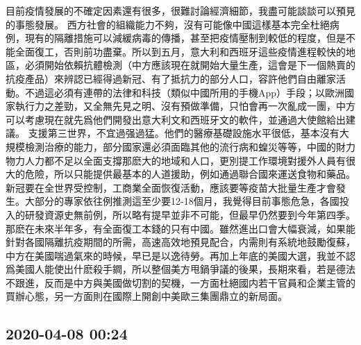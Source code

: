\documentclass[twocolumn]{ctexart}
\begin{document}
目前疫情發展的不確定因素還有很多，很難討論經濟細節，我盡可能談談可以預見的事態發展。
西方社會的組織能力不夠，沒有可能像中國這樣基本完全杜絕病例，現有的隔離措施可以減緩病毒的傳播，甚至把疫情壓制到較低的程度，但是不能全面復工，否則前功盡棄。所以到五月，意大利和西班牙這些疫情進程較快的地區，必須開始依賴抗體檢測（中方應該現在就開始大量生產，這會是下一個熱賣的抗疫產品）來辨認已經得過新冠、有了抵抗力的部分人口，容許他們自由離家活動。不過這必須有連帶的法律和科技（類似中國所用的手機App）手段；以歐洲國家執行力之差勁，又全無先見之明、沒有預做準備，只怕會再一次亂成一團，中方可以考慮現在就先爲他們開發出意大利文和西班牙文的軟件，並通過大使館給出建議。
支援第三世界，不宜過强過猛。他們的醫療基礎設施水平很低，基本沒有大規模檢測治療的能力，部分國家還必須面臨其他的流行病和蝗災等等，中國的財力物力人力都不足以全面支撐那麽大的地域和人口，更別提工作環境對援外人員有很大的危險，所以只能提供最基本的人道援助，例如通過聯合國來運送食物和藥品。
新冠要在全世界受控制，工商業全面恢復活動，應該要等疫苗大批量生產才會發生。大部分的專家依往例推測這至少要12-18個月，我覺得目前事態危急，各國投入的研發資源史無前例，所以略有提早並非不可能，但最早仍然要到今年第四季。那麽在未來半年多，有全面復工本錢的只有中國。雖然進出口會大幅衰減，如果能針對各國隔離抗疫期間的所需，高速高效地預見配合，内需則有系統地鼓勵復蘇，中方在美國喘過氣來的時候，早已是以逸待勞。再加上年底的美國大選，我並不認爲美國人能使出什麽殺手鐧，所以整個美方甩鍋爭議的後果，長期來看，若是德法不跟進，反而是中方與美國做切割的契機，一方面杜絕國内若干官員和企業主管的買辦心態，另一方面則在國際上開創中美歐三集團鼎立的新局面。
\subsection*{2020-04-08 00:24}
\end{document}
